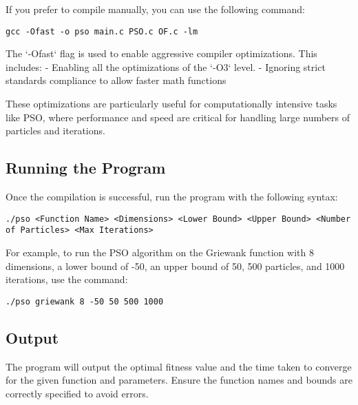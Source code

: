 \documentclass[12pt]{article}
\begin{document}
If you prefer to compile manually, you can use the following command:
\begin{lstlisting}[basicstyle=\small]
gcc -Ofast -o pso main.c PSO.c OF.c -lm
\end{lstlisting}

\newpage
The `-Ofast` flag is used to enable aggressive compiler optimizations. This includes:
- Enabling all the optimizations of the `-O3` level.
- Ignoring strict standards compliance to allow faster math functions 

These optimizations are particularly useful for computationally intensive tasks like PSO, where performance and speed are critical for handling large numbers of particles and iterations.

\subsection{Running the Program}
Once the compilation is successful, run the program with the following syntax:
\begin{lstlisting}[basicstyle=\small]
./pso <Function Name> <Dimensions> <Lower Bound> <Upper Bound> <Number of Particles> <Max Iterations>
\end{lstlisting}

For example, to run the PSO algorithm on the Griewank function with 8 dimensions, a lower bound of -50, an upper bound of 50, 500 particles, and 1000 iterations, use the command:
\begin{lstlisting}[basicstyle=\small]
./pso griewank 8 -50 50 500 1000
\end{lstlisting}

\subsection{Output}
The program will output the optimal fitness value and the time taken to converge for the given function and parameters. Ensure the function names and bounds are correctly specified to avoid errors.

	
	
\end{document}
